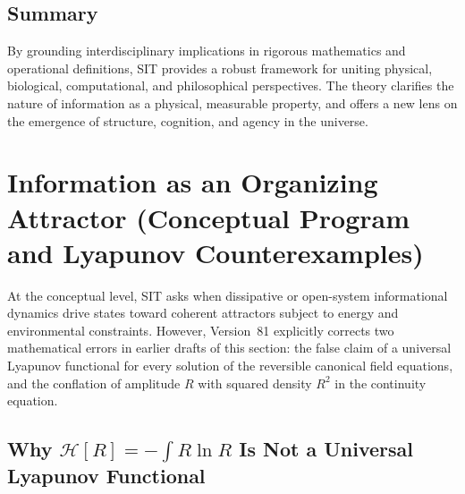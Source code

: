 \subsection{Summary}

By grounding interdisciplinary implications in rigorous mathematics and operational definitions, SIT provides a robust framework for uniting physical, biological, computational, and philosophical perspectives. The theory clarifies the nature of information as a physical, measurable property, and offers a new lens on the emergence of structure, cognition, and agency in the universe.

\section{Information as an Organizing Attractor (Conceptual Program and Lyapunov Counterexamples)}

At the conceptual level, SIT asks when dissipative or open-system informational dynamics drive states toward coherent attractors subject to energy and environmental constraints. However, Version~81 explicitly corrects two mathematical errors in earlier drafts of this section: the false claim of a universal Lyapunov functional for every solution of the reversible canonical field equations, and the conflation of amplitude $R$ with squared density $R^2$ in the continuity equation.

\subsection{Why $\mathcal{H}[R] = -\int R\ln R$ Is Not a Universal Lyapunov Functional}

